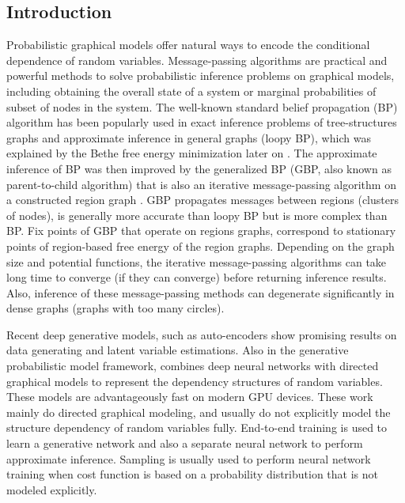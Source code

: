\subsection{Introduction}
Probabilistic graphical models offer natural ways to encode the conditional dependence of random variables. Message-passing algorithms are practical and powerful methods to solve probabilistic inference problems on graphical models, including obtaining the overall state of a system or marginal probabilities of subset of nodes in the system. The well-known standard belief propagation (BP) algorithm \cite{Pearl1982reverend,kschischang2001factor_graph} has been popularly used in exact inference problems of tree-structures graphs and approximate inference in general graphs (loopy BP), which was explained by the Bethe free energy minimization later on \cite{yedidia2003understanding}. The approximate inference of BP was then improved by the generalized BP (GBP, also known as parent-to-child algorithm) that is also an iterative message-passing algorithm on a constructed region graph \cite{Yedidia:2000:GBP:3008751.3008848, yedida2005constucting}. GBP propagates messages between regions (clusters of nodes), is generally more accurate than loopy BP but is more complex than BP. Fix points of GBP that operate on regions graphs, correspond to stationary points of region-based free energy of the region graphs. Depending on the graph size and potential functions, the iterative message-passing algorithms can take long time to converge (if they can converge) before returning inference results. Also, inference of these message-passing methods can degenerate significantly in dense graphs (graphs with too many circles).

Recent deep generative models, such as auto-encoders \cite{DBLP:journals/corr/KingmaW13,2017arXiv170104722M, 2017arXiv171101558T} show promising results on data generating and latent variable estimations. Also in the generative probabilistic model framework, \cite{li2018graphical, johansonNIPS2016_6379} combines deep neural networks with directed graphical models to represent the dependency structures of random variables.
These models are advantageously fast on modern GPU devices.
These work mainly do directed graphical modeling, and usually do not explicitly model the structure dependency of random variables fully. End-to-end training is used to learn a generative network and also a separate neural network to perform approximate inference. Sampling is usually used to perform neural network training when cost function is based on a probability distribution that is not modeled explicitly.

